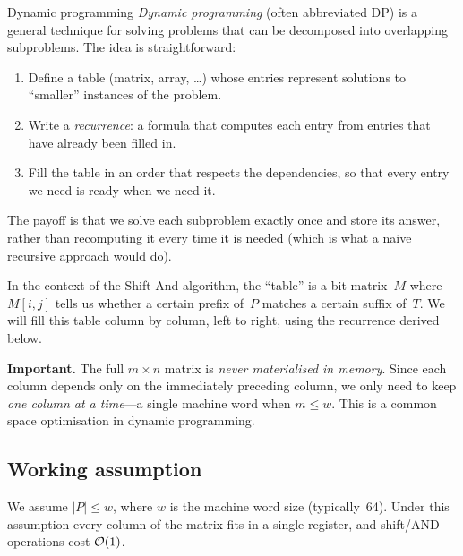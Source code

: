 \begin{intermezzo}{Dynamic programming}
\emph{Dynamic programming} (often abbreviated DP) is a general technique for
solving problems that can be decomposed into overlapping subproblems.  The idea
is straightforward:

\begin{enumerate}[nosep]
  \item Define a table (matrix, array, \ldots) whose entries represent solutions
        to ``smaller'' instances of the problem.
  \item Write a \emph{recurrence}: a formula that computes each entry from
        entries that have already been filled in.
  \item Fill the table in an order that respects the dependencies, so that every
        entry we need is ready when we need it.
\end{enumerate}

The payoff is that we solve each subproblem exactly once and store its answer,
rather than recomputing it every time it is needed (which is what a naive
recursive approach would do).

In the context of the Shift-And algorithm, the ``table'' is a bit matrix~$M$
where $M[i,j]$ tells us whether a certain prefix of~$P$ matches a certain
suffix of~$T$.  We will fill this table column by column, left to right,
using the recurrence derived below.

\smallskip\noindent
\textbf{Important.}  The full $m \times n$ matrix is \emph{never materialised
in memory}.  Since each column depends only on the immediately preceding
column, we only need to keep \emph{one column at a time}---a single machine
word when $m \le w$.  This is a common space optimisation in dynamic programming.
\end{intermezzo}

\subsection{Working assumption}

\begin{remark}
  We assume $|P| \le w$, where $w$ is the machine word size (typically~64).
  Under this assumption every column of the matrix fits in a single register,
  and shift/AND operations cost $\mathcal{O}\!\left(1\right)$.
\end{remark}

